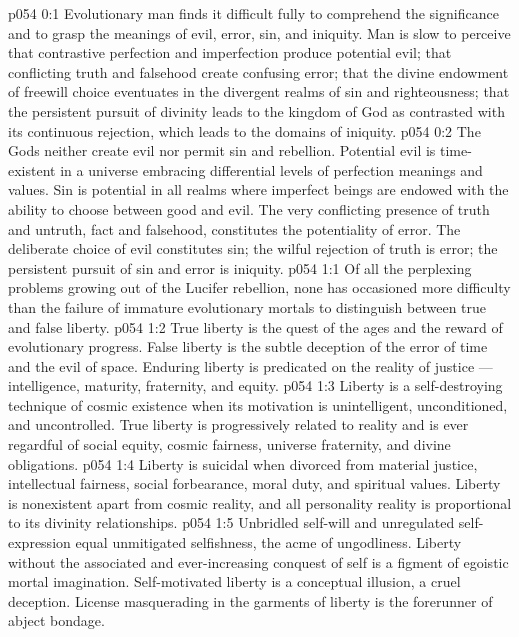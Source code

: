 \author{Mighty Messenger}
\vs p054 0:1 Evolutionary man finds it difficult fully to comprehend the significance and to grasp the meanings of evil, error, sin, and iniquity. Man is slow to perceive that contrastive perfection and imperfection produce potential evil; that conflicting truth and falsehood create confusing error; that the divine endowment of freewill choice eventuates in the divergent realms of sin and righteousness; that the persistent pursuit of divinity leads to the kingdom of God as contrasted with its continuous rejection, which leads to the domains of iniquity.
\vs p054 0:2 The Gods neither create evil nor permit sin and rebellion. Potential evil is time\hyp{}existent in a universe embracing differential levels of perfection meanings and values. Sin is potential in all realms where imperfect beings are endowed with the ability to choose between good and evil. The very conflicting presence of truth and untruth, fact and falsehood, constitutes the potentiality of error. The deliberate choice of evil constitutes sin; the wilful rejection of truth is error; the persistent pursuit of sin and error is iniquity.
\vs p054 1:1 Of all the perplexing problems growing out of the Lucifer rebellion, none has occasioned more difficulty than the failure of immature evolutionary mortals to distinguish between true and false liberty.
\vs p054 1:2 True liberty is the quest of the ages and the reward of evolutionary progress. False liberty is the subtle deception of the error of time and the evil of space. Enduring liberty is predicated on the reality of justice --- intelligence, maturity, fraternity, and equity.
\vs p054 1:3 Liberty is a self\hyp{}destroying technique of cosmic existence when its motivation is unintelligent, unconditioned, and uncontrolled. True liberty is progressively related to reality and is ever regardful of social equity, cosmic fairness, universe fraternity, and divine obligations.
\vs p054 1:4 Liberty is suicidal when divorced from material justice, intellectual fairness, social forbearance, moral duty, and spiritual values. Liberty is nonexistent apart from cosmic reality, and all personality reality is proportional to its divinity relationships.
\vs p054 1:5 Unbridled self\hyp{}will and unregulated self\hyp{}expression equal unmitigated selfishness, the acme of ungodliness. Liberty without the associated and ever\hyp{}increasing conquest of self is a figment of egoistic mortal imagination. Self\hyp{}motivated liberty is a conceptual illusion, a cruel deception. License masquerading in the garments of liberty is the forerunner of abject bondage.
